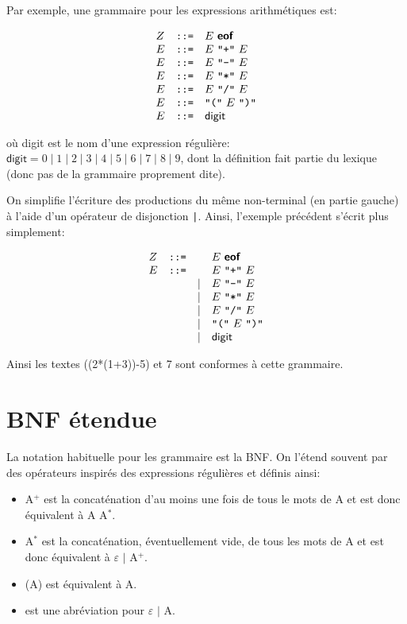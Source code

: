 \documentclass[11pt,a4paper]{article}
\newcommand{\assign}{\mbox{\texttt{::=}}\xspace}
\newcommand{\str}[1]{\texttt{"{#1}"}}
\newcommand{\eof}{\textsf{\textbf{eof}}\xspace}
\newcommand{\bitem}{\item[$\bullet$]}
\begin{document}
Par exemple, une grammaire pour les expressions arithmétiques est:

\[
\begin{array}{lcl}
  Z & \assign & E \ \eof \\
  E & \assign & E \ \str{+} \ E\\
  E & \assign & E \ \str{-} \ E\\
  E & \assign & E \ \str{*} \ E\\
  E & \assign & E \ \str{/} \ E \\
  E & \assign & \str{(} \ E \ \str{)}\\
  E & \assign & \textsf{digit}
\end{array}
\]

\noindent
où \textsf{digit} est le nom d'une expression régulière:
$\textsf{digit} = 0 \mid 1 \mid 2 \mid 3 \mid 4 \mid 5 \mid 6 \mid 7
\mid 8 \mid 9$, dont la définition fait partie du lexique (donc pas de
la grammaire proprement dite).

On simplifie l'écriture des productions du même non-terminal (en
partie gauche) à l'aide d'un opérateur de disjonction \verb+|+. Ainsi,
l'exemple précédent s'écrit plus simplement:

\[
\begin{array}{lcrl}
  Z & \assign &      & E \ \eof\\
  E & \assign &      & E \ \str{+} \ E\\
    &         & \mid & E \ \str{-} \ E\\
    &         & \mid & E \ \str{*} \ E\\
    &         & \mid & E \ \str{/} \ E\\
    &         & \mid & \str{(} \ E \ \str{)}\\
    &         & \mid & \textsf{digit}
\end{array}
\]

Ainsi les textes \textsf{((2*(1+3))-5)} et \textsf{7} sont conformes à
cette grammaire.

\section{BNF étendue}\label{EBNF}

La notation habituelle pour les grammaire est la BNF. On l'étend
souvent par des opérateurs inspirés des expressions régulières et
définis ainsi:

\begin{itemize}

  \bitem A$^{+}$ est la concaténation d'au moins une fois de tous le
  mots de A et est donc équivalent à A A$^{*}$.

  \bitem A$^{*}$ est la concaténation, éventuellement vide, de tous
  les mots de A et est donc équivalent à $\varepsilon$ $\mid$ A$^{+}$.

  \bitem (A) est équivalent à A.

  \bitem [A] est une abréviation pour $\varepsilon$ $\mid$ A.

\end{itemize}
\end{document}
